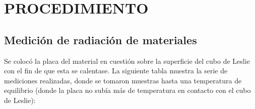 \documentclass[a4paper]{article}
\begin{document}
    \section{PROCEDIMIENTO}
        \subsection{Medición de radiación de materiales}

        \indent Se colocó la placa del material en cuestión sobre la superficie del cubo de Leslie con el fin de que esta se calentase. La siguiente tabla muestra la serie de mediciones realizadas, donde se tomaron muestras hasta una temperatura de equilibrio (donde la placa no subía más de temperatura en contacto con el cubo de Leslie):

    \newpage
    \thispagestyle{fancy}
\end{document}
